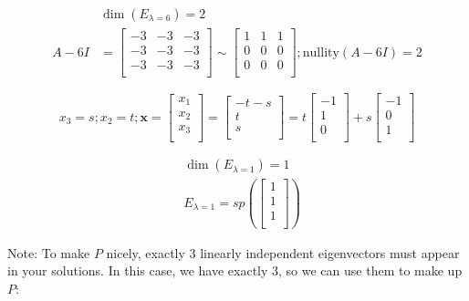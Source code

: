 \documentclass[12pt]{article}
\theoremstyle{plain}
\theoremstyle{remark}
\theoremstyle{definition}
\begin{document}
\begin{align*}
&\dim\left( E_{\lambda = 6} \right) = 2 \\
A - 6I &= \begin{bmatrix} - 3 & - 3 & - 3 \\ - 3 & - 3 & - 3 \\ - 3 & - 3 & - 3 \\\end{bmatrix}\sim\begin{bmatrix}1 & 1 & 1 \\0 & 0 & 0 \\0 & 0 & 0 \\\end{bmatrix};\text{nullity}(A - 6I) = 2
\end{align*}


\[x_{3} = s;x_{2} = t;\mathbf{x} = \begin{bmatrix}
x_{1} \\
x_{2} \\
x_{3} \\
\end{bmatrix} = \begin{bmatrix}
 - t - s \\
t \\
s \\
\end{bmatrix} = t\begin{bmatrix}
 - 1 \\
1 \\
0 \\
\end{bmatrix} + s\begin{bmatrix}
 - 1 \\
0 \\
1 \\
\end{bmatrix}\]

\begin{align*}
&\dim\left( E_{\lambda = 1} \right) = 1 \\
&E_{\lambda = 1} = sp\left( \begin{bmatrix}1 \\1 \\1 \\\end{bmatrix} \right)
\end{align*}


Note: To make \(P\) nicely, exactly 3 linearly independent eigenvectors
must appear in your solutions. In this case, we have exactly 3, so we
can use them to make up \(P\):
\end{document}
